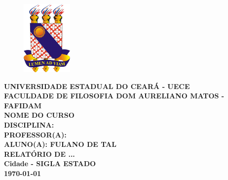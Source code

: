\documentclass[a4paper, 12 pt]{article}                                	%
\begin{document}
	\begin{titlepage}
		\begin{center}
			\begin{figure}
				\centering
				\includegraphics[scale=2.5]{figuras/uece.png}
			\end{figure}
			
			\large
			\textbf{UNIVERSIDADE ESTADUAL DO CEARÁ - UECE\\ \vspace{0.5cm}
				FACULDADE DE FILOSOFIA DOM AURELIANO MATOS - FAFIDAM\\ \vspace{0.5cm}
				NOME DO CURSO \\ \vspace{0.5cm}
				DISCIPLINA: \\ \vspace{0.5cm}
				PROFESSOR(A): \\ \vspace{0.5cm}
				ALUNO(A):\textnormal{ FULANO DE TAL} \\ \vspace{5cm}
				RELATÓRIO DE ... \\ \vspace{7cm}
				Cidade - SIGLA ESTADO \\ \vspace{0.5cm} \today{}}  %
		\end{center}
	\end{titlepage}
		
\end{document}
